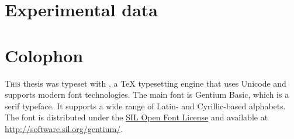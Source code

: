 \documentclass[11pt,a4paper,english,oneside]{book}
\begin{document}

\cleardoublepage
{
  \pagestyle{bibliography}
  
  
  \thispagestyle{bibliography}
}

\cleardoublepage
\appendix

\chapter{Experimental data}


























\clearpage







\chapter*{Colophon}

\lettrine[lines=5,loversize=0.25]{T}{his} thesis was typeset with {\rm \XeLaTeX}, a \TeX{} typesetting engine that uses Unicode and supports modern font technologies.
%
The main font is Gentium Basic, which is a serif typeface. It supports a wide range of Latin- and Cyrillic-based alphabets.
%
The font is distributed under the \href{http://scripts.sil.org/ofl}{SIL Open Font License} and available at \url{http://software.sil.org/gentium/}.
\end{document}
